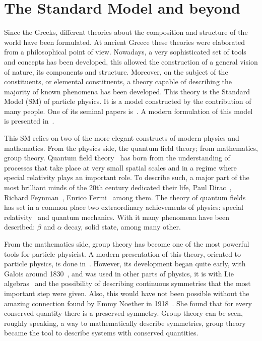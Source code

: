 \chapter[The Standard Model]{The Standard Model and beyond}
\label{chap:SM}
Since the Greeks, different theories about the composition and structure of the world have been formulated. At ancient Greece these theories were elaborated from a philosophical point of view. Nowadays, a very sophisticated set of tools and concepts has been developed, this allowed the construction of a general vision of nature, its components and structure. Moreover, on the subject of the constituents, or elemental constituents, a theory capable of describing the majority of known phenomena has been developed. This theory is the Standard Model (SM) of particle physics. It is a model constructed by the contribution of many people. One of its seminal papers is~\cite{PhysRevLett.19.1264}. A modern formulation of this model is presented in~\cite{Griffiths:2008zz}. 

This SM relies on two of the more elegant constructs of modern physics and mathematics. From the physics side, the quantum field theory; from mathematics, group theory. Quantum field theory~\cite{RevModPhys.13.203} has born from the understanding of processes that take place at very small spatial scales and in a regime where special relativity plays an important role. To describe such, a major part of the most brilliant minds of the 20th century dedicated their life, Paul Dirac~\cite{Dirac:1927dy}, Richard Feynman~\cite{Feynman:1950ir}, Enrico Fermi~\cite{Fermi:1934hr} among them. The theory of quantum fields has set in a common place two extraordinary achievements of physics: special relativity~\cite{Einstein:1905ve} and quantum mechanics. With it many phenomena have been described: $\beta$ and $\alpha$ decay, solid state, among many other.

From the mathematics side, group theory has become one of the most powerful tools for particle physicist. A modern presentation of this theory, oriented to particle physics, is done in~\cite{Georgi:1999wka}. However, its development began quite early, with Galois around 1830~\cite{Galois:2013}, and was used in other parts of physics, it is with Lie algebras~\cite{Georgi:1999wka} and the possibility of describing continuous symmetries that the most important step were given. Also, this would have not been possible without the amazing connection found by Emmy Noether in 1918~\cite{1971TTSP....1..186N}. She found that for every conserved quantity there is a preserved symmetry. Group theory can be seen, roughly speaking, a way to mathematically describe symmetries, group theory became the tool to describe systems with conserved quantities. 

